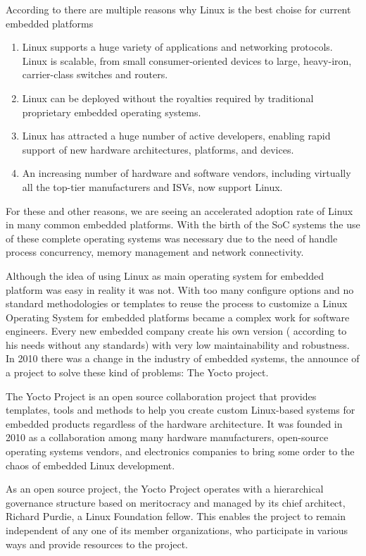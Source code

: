 According to \cite{} there are multiple reasons why Linux is the best choise
for current embedded platforms 

\begin{enumerate}
\item Linux supports a huge variety of applications and networking protocols.
Linux is scalable, from small consumer-oriented devices to large, heavy-iron,
carrier-class switches and routers.
\item Linux can be deployed without the royalties required by traditional proprietary
embedded operating systems.
\item Linux has attracted a huge number of active developers, enabling rapid support
of new hardware architectures, platforms, and devices.
\item An increasing number of hardware and software vendors, including virtually all
the top-tier manufacturers and ISVs, now support Linux.
\end{enumerate}

For these and other reasons, we are seeing an accelerated adoption rate of
Linux in many common embedded platforms. With the birth of the SoC systems the
use of these complete operating systems was necessary due to the need of handle
process concurrency, memory management and network connectivity.

Although the idea of using Linux as main operating system for embedded platform
was easy in reality it was not. With too many configure options and no standard
methodologies or templates to reuse the process to customize a Linux Operating
System for embedded platforms became a complex work for software engineers.
Every new embedded company create his own version ( according to his needs
without any standards) with very low maintainability and robustness. In 2010
there was a change in the industry of embedded systems, the announce of a
project to solve these kind of problems: The Yocto project.

The Yocto Project is an open source collaboration project that provides
templates, tools and methods to help you create custom Linux-based systems for
embedded products regardless of the hardware architecture. It was founded in
2010 as a collaboration among many hardware manufacturers, open-source
operating systems vendors, and electronics companies to bring some order to the
chaos of embedded Linux development.\cite{yocto-project}

As an open source project, the Yocto Project operates with a hierarchical
governance structure based on meritocracy and managed by its chief architect,
Richard Purdie, a Linux Foundation fellow. This enables the project to remain
independent of any one of its member organizations, who participate in various
ways and provide resources to the project.

